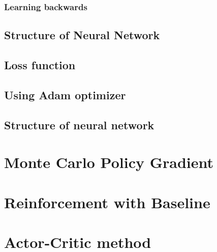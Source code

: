 \documentclass[a4paper,12pt]{article}  %
\theoremstyle{definition}
\begin{document}
	\subsubsection{Learning backwards}
	
	
	\subsection{Structure of Neural Network}
	
	\subsection{Loss function}
	
	\subsection{Using Adam optimizer}
	
	
	\subsection{Structure of neural network}
	
	\section{Monte Carlo Policy Gradient}
	
	\section{Reinforcement with Baseline}
	
	\section{Actor-Critic method}
		
	

	
	\small
	
	 
	
\end{document}
